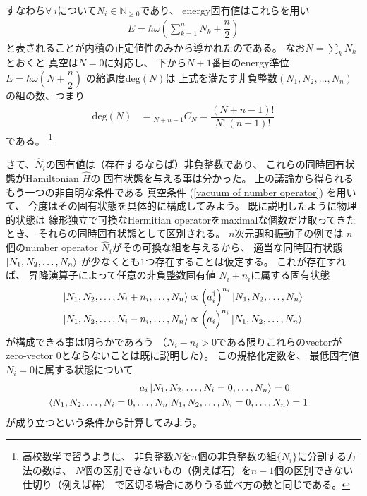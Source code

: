 すなわち$\forall\ i$について$N_i \in \mathbb{N}_{\ge 0}$であり、
energy固有値はこれらを用い
\begin{align}
    E = \hbar\omega
    \left(
    \sum_{k=1}^n
        N_k
    +
        \dfrac{ n }{ 2 }
    \right)
\label{energy spectrum of harmonic oscillator}
\end{align}
と表されることが内積の正定値性のみから導かれたのである。
なお$N = \sum_k N_k$とおくと
真空は$N=0$に対応し、
下から$N+1$番目のenergy準位
$E = \hbar \omega \left(N + \dfrac{n}{2} \right) $
の縮退度$\mathrm{deg}(N)$は
上式を満たす非負整数$(N_1, N_2,\dots, N_n)$の組の数、つまり
\begin{align}
    \mathrm{deg}(N)
    &=
    {}_{N + n-1}C_{N}
    =
    \dfrac{(N+n-1)!}{N!\ (n-1)!}
\end{align}
である。
\footnote{
    高校数学で習うように、
    非負整数$N$を$n$個の非負整数の組$\{N_i\}$に分割する方法の数は、
    $N$個の区別できないもの（例えば石）を$n-1$個の区別できない仕切り（例えば棒）
    で区切る場合にありうる並べ方の数と同じである。
}

さて、$\hat{N}_i$の固有値は（存在するならば）非負整数であり、
これらの同時固有状態がHamiltonian $\hat{H}$の
固有状態を与える事は分かった。
上の議論から得られるもう一つの非自明な条件である
真空条件
(\ref{vacuum of number operator})
を用いて、
今度はその固有状態を具体的に構成してみよう。
既に説明したように物理的状態は
線形独立で可換なHermitian operatorをmaximalな個数だけ取ってきたとき、
それらの同時固有状態として区別される。
$n$次元調和振動子の例では
$n$個のnumber operator $\hat{N}_i$がその可換な組を与えるから、
適当な同時固有状態
$\ket{N_1, N_2,\dots, N_n}$
が少なくとも$1$つ存在することは仮定する。
これが存在すれば、
昇降演算子によって任意の非負整数固有値
$N_i\pm n_i$に属する固有状態
\begin{subequations}
\begin{align}
    \ket{N_1, N_2,\dots,N_i+n_i,\dots, N_n}
    &\propto
    \left(
        a_i^\dagger
    \right)^{n_i}
    \ket{N_1, N_2,\dots, N_n}
\\
    \ket{N_1, N_2,\dots,N_i-n_i,\dots, N_n}
    &\propto
    \Big(
        a_i
    \Big)^{n_i}
    \ket{N_1, N_2,\dots, N_n}
\end{align}
\end{subequations}
が構成できる事は明らかであろう
（$N_i - n_i > 0$である限りこれらのvectorが
zero-vector $0$とならないことは既に説明した）。
この規格化定数を、
最低固有値$N_i = 0$に属する状態について
\begin{align}
    a_i \ket{N_1, N_2,\dots, N_i = 0,\dots, N_n} = 0
\\
    \braket{N_1, N_2,\dots, N_i = 0,\dots, N_n
    |
    N_1, N_2,\dots, N_i = 0,\dots, N_n}
    &=1
\end{align}
が成り立つという条件から計算してみよう。

